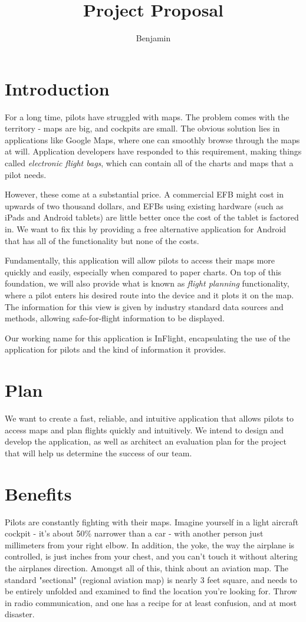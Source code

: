 \documentclass[10pt,a4paper]{report}
\author{Benjamin}
\title{Project Proposal}
\begin{document}
\section{Introduction}
For a long time, pilots have struggled with maps. The problem comes with the territory - maps are big, and cockpits are small. The obvious solution lies in applications like Google Maps, where one can smoothly browse through the maps at will. Application developers have responded to this requirement, making things called \emph{electronic flight bags}, which can contain all of the charts and maps that a pilot needs. 

However, these come at a substantial price. A commercial EFB might cost in upwards of two thousand dollars, and EFBs using existing hardware (such as iPads and Android tablets) are little better once the cost of the tablet is factored in. We want to fix this by providing a free alternative application for Android that has all of the functionality but none of the costs.

Fundamentally, this application will allow pilots to access their maps more quickly and easily, especially when compared to paper charts. On top of this foundation, we will also provide what is known as \emph{flight planning} functionality, where a pilot enters his desired route into the device and it plots it on the map. The information for this view is given by industry standard data sources and methods, allowing safe-for-flight information to be displayed.

Our working name for this application is InFlight, encapsulating the use of the application for pilots and the kind of information it provides.
\section{Plan}
We want to create a fast, reliable, and intuitive application that allows pilots to access maps and plan flights quickly and intuitively. We intend to design and develop the application, as well as architect an evaluation plan for the project that will help us determine the success of our team.
\section{Benefits}
Pilots are constantly fighting with their maps. Imagine yourself in a light aircraft cockpit - it's about 50\% narrower than a car - with another person just millimeters from your right elbow. In addition, the yoke, the way the airplane is controlled, is just inches from your chest, and you can't touch it without altering the airplanes direction. Amongst all of this, think about an aviation map. The standard "sectional" (regional aviation map) is nearly 3 feet square, and needs to be entirely unfolded and examined to find the location you're looking for. Throw in radio communication, and one has a recipe for at least confusion, and at most disaster. 
\end{document}
